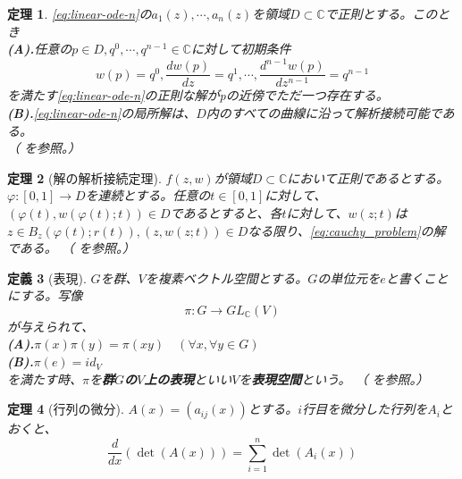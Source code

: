 \documentclass[paper=a4, fontsize=11pt]{jlreq} %
\theoremstyle{break}
\newtheorem{theorem}{定理}[section]
\newtheorem{definition}[theorem]{定義}
\theoremstyle{qa}
\theoremstyle{remark} %
\begin{document}
\begin{theorem}\label{thm:linear_ode_existence_and_continuation}
    \eqref{eq:linear-ode-n}の$a_{1}(z),\cdots,a_{n}(z)$を領域$D\subset\mathbb{C}$で正則とする。このとき\\
    \textbf{(A).}任意の$p\in D,q^{0},\cdots,q^{n-1}\in\mathbb{C}$に対して初期条件
    \[
    w(p)=q^{0},\frac{dw(p)}{dz}=q^{1},\cdots,\frac{d^{n-1}w(p)}{dz^{n-1}}=q^{n-1}
    \]
    を満たす\eqref{eq:linear-ode-n}の正則な解がpの近傍でただ一つ存在する。\\
    \textbf{(B).}\eqref{eq:linear-ode-n}の局所解は、$D$内のすべての曲線に沿って解析接続可能である。\\
    （\cite[p.127 定理25.3]{book:kimura} を参照。）
\end{theorem}
\begin{theorem}[解の解析接続定理]\label{thm:ode_solution_continuation}
   $f(z,w)$が領域$D\subset\mathbb{C}$において正則であるとする。$\varphi:[0,1]\to D$を連続とする。任意の$t\in[0,1]$に対して、$(\varphi(t),w(\varphi(t);t))\in D$であるとすると、各$t$に対して、$w(z;t)$は$z\in B_{z}(\varphi(t);r(t)), (z,w(z;t))\in D$なる限り、\eqref{eq:cauchy_problem}の解である。
   （\cite[p.56 定理8.6]{book:takano} を参照。）
\end{theorem}
\begin{definition}[表現]\label{dfn:representation}
    $G$を群、$V$を複素ベクトル空間とする。$G$の単位元を$e$と書くことにする。写像
    \[
    \pi:G\to GL_{\mathbb{C}}(V)
    \]
    が与えられて、\\
    \textbf{(A).}$\pi(x)\pi(y)=\pi(xy)\quad(\forall x, \forall y\in G)$\\
    \textbf{(B).}$\pi(e)=id_{V}$\\
    を満たす時、$\pi$を\textbf{群$G$の$V$上の表現}といい$V$を\textbf{表現空間}という。
    （\cite[p.10 定義1.12]{book:kobayashi} を参照。）
\end{definition}
\begin{theorem}[行列の微分]\label{thm:derivative-of-determinant}
    $A(x)=(a_{ij}(x))$とする。$i$行目を微分した行列を$A_{i}$とおくと、
    \[
    \frac{d}{dx}(\det(A(x)))=\sum_{i=1}^{n}\det(A_{i}(x))
    \]
\end{theorem}
\end{document}
